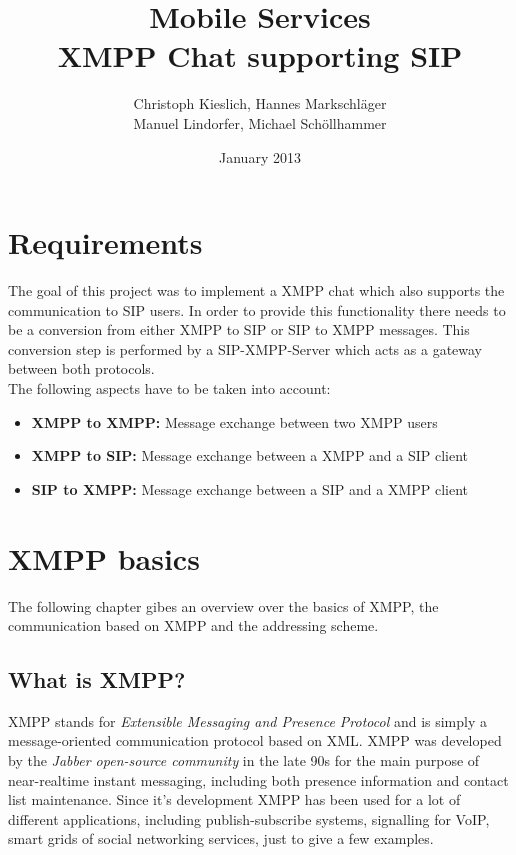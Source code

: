 \documentclass{article}
\title{Mobile Services\\ XMPP Chat supporting SIP}
\author{Christoph Kieslich, Hannes Markschläger\\ Manuel Lindorfer, Michael Schöllhammer}
\date{January 2013}
\begin{document}
\maketitle

\newpage

\section{Requirements}

The goal of this project was to implement a XMPP chat which also supports the communication to SIP users. In order to provide this functionality there needs to be a conversion from either XMPP to SIP or SIP to XMPP messages. This conversion step is performed by a SIP-XMPP-Server which acts as a gateway between both protocols.\\

\noindent
The following aspects have to be taken into account:\\

\begin{itemize}
    \item \textbf{XMPP to XMPP:} Message exchange between two XMPP users
    \item \textbf{XMPP to SIP:} Message exchange between a XMPP and a SIP client
    \item \textbf{SIP to XMPP:} Message exchange between a SIP and a XMPP client
\end{itemize}

\noindent

\newpage

\section{XMPP basics}
The following chapter gibes an overview over the basics of XMPP, the communication based on XMPP and the addressing scheme.

\subsection{What is XMPP?}

XMPP stands for \emph{Extensible Messaging and Presence Protocol} and is simply a message-oriented communication protocol based on XML. XMPP was developed by the \emph{Jabber open-source community} in the late 90s for the main purpose of near-realtime instant messaging, including both presence information and contact list maintenance. Since it's development XMPP has been used for a lot of different applications, including publish-subscribe systems, signalling for VoIP, smart grids of social networking services, just to give a few examples.\\
\end{document}

